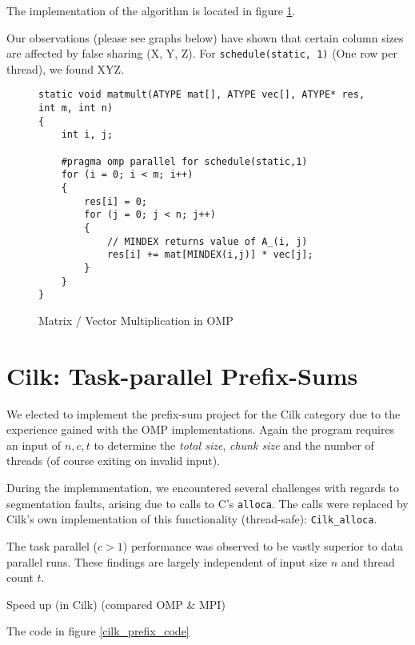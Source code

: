 \documentclass[11pt]{article}
\begin{document}
The implementation of the algorithm is located in figure \ref{omp_matmult_code}.

Our observations (please see graphs below) have shown that certain column sizes are affected by false sharing (X, Y, Z). For \verb=schedule(static, 1)= (One row per thread), we found XYZ.


\begin{figure}[h]
\label{omp_matmult_code}
\caption{Matrix / Vector Multiplication in OMP}
\begin{lstlisting}
static void matmult(ATYPE mat[], ATYPE vec[], ATYPE* res, int m, int n)
{
	int i, j;

	#pragma omp parallel for schedule(static,1)
	for (i = 0; i < m; i++) 
	{
		res[i] = 0;
		for (j = 0; j < n; j++) 
		{
			// MINDEX returns value of A_(i, j)
			res[i] += mat[MINDEX(i,j)] * vec[j];
		}
	}
}
\end{lstlisting}
\end{figure}



\section{Cilk: Task-parallel Prefix-Sums}
We elected to implement the prefix-sum project for the Cilk category due to the experience gained with the OMP implementations. Again the program requires an input of $n, c, t$ to determine the \emph{total size}, \emph{chunk size} and the number of threads (of course exiting on invalid input).

During the implemmentation, we encountered several challenges with regards to segmentation faults, arising due to calls to C's \verb=alloca=. The calls were replaced by Cilk's own implementation of this functionality (thread-safe): \verb=Cilk_alloca=.

The task parallel ($c > 1$) performance was observed to be vastly superior to data parallel runs. These findings are largely independent of input size $n$ and thread count $t$.

Speed up (in Cilk) (compared OMP \& MPI)

The code in figure \ref{cilk_prefix_code} 
\end{document}
